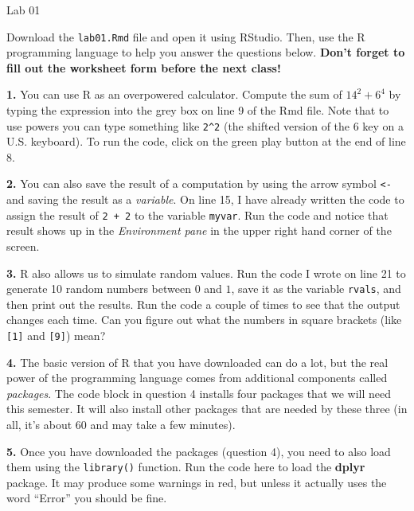 \documentclass{tufte-handout}
\begin{document}
\justify

{\LARGE Lab 01}

\vspace*{18pt}

Download the \texttt{lab01.Rmd} file and open it using RStudio. Then, use the
R programming language to help you answer the questions below. \textbf{Don't
forget to fill out the worksheet form before the next class!}

\vspace*{12pt}

\textbf{1.} You can use R as an overpowered calculator. Compute the sum of
$14^2 + 6^4$ by typing the expression into the grey box on line 9 of the
Rmd file. Note that to use powers you can type something like \verb|2^2|
(the shifted version of the 6 key on a U.S. keyboard). To run the code, click
on the green play button at the end of line 8.

\bigskip

\textbf{2.} You can also save the result of a computation by using the arrow
symbol \texttt{<-} and saving the result as a \textit{variable}. On line 15,
I have already written the code to assign the result of \texttt{2 + 2} to the
variable \texttt{myvar}. Run the code and notice that result shows up in the
\textit{Environment pane} in the upper right hand corner of the screen.

\bigskip

\textbf{3.} R also allows us to simulate random values. Run the code I wrote
on line 21 to generate 10 random numbers between $0$ and $1$, save it as the
variable \texttt{rvals}, and then print out the results. Run the code a couple
of times to see that the output changes each time. Can you figure out what the
numbers in square brackets (like \texttt{[1]} and \texttt{[9]}) mean?

\bigskip

\textbf{4.} The basic version of R that you have downloaded can do a lot, but
the real power of the programming language comes from additional components
called \textit{packages}. The code block in question 4 installs four packages
that we will need this semester. It will also install other packages that are
needed by these three (in all, it's about 60 and may take a few minutes).

\bigskip

\textbf{5.} Once you have downloaded the packages (question 4), you need to
also load them using the \texttt{library()} function. Run the code here to
load the \textbf{dplyr} package. It may produce some warnings in red, but
unless it actually uses the word ``Error'' you should be fine.
\end{document}
